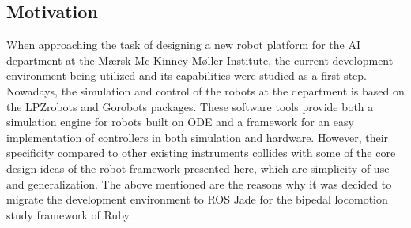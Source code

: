 
\subsection{Motivation} %
\label{sub:motivation}
When approaching the task of designing a new robot platform for the AI department at the Mærsk Mc-Kinney Møller Institute, the current development environment being utilized and its capabilities were studied as a first step.
Nowadays, the simulation and control of the robots at the department is based on the LPZrobots \cite{lpzrobots} and Gorobots \cite{} packages.
These software tools provide both a simulation engine for robots built on ODE \cite{ode} and a framework for an easy implementation of controllers in both simulation and hardware.
However, their specificity compared to other existing instruments collides with some of the core design ideas of the robot framework presented here, which are simplicity of use and generalization.
The above mentioned are the reasons why it was decided to migrate the development environment to ROS Jade \cite{ros} for the bipedal locomotion study framework of Ruby. 

